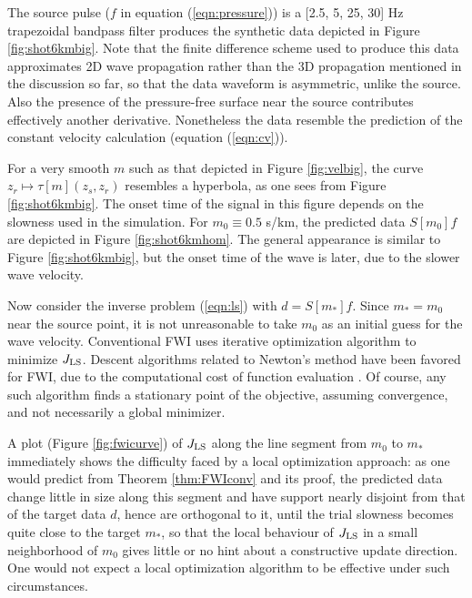 The source pulse ($f$ in equation (\ref{eqn:pressure})) is a [2.5, 5, 25, 30]
Hz trapezoidal bandpass filter produces the synthetic data
depicted in Figure \ref{fig:shot6kmbig}. Note that the finite
difference scheme used to produce this data approximates 2D wave
propagation rather than the 3D propagation mentioned in the discussion
so far, so that the data waveform is asymmetric, unlike the
source. Also the presence of the pressure-free surface near the source
contributes effectively another derivative. Nonetheless the data
resemble the prediction of the constant velocity calculation (equation
(\ref{eqn:cv})).

For a very smooth $m$ such as that depicted in Figure
\ref{fig:velbig}, the curve $z_r \mapsto \tau[m](z_s,z_r)$ resembles a hyperbola, as one sees from Figure
\ref{fig:shot6kmbig}. The onset time of the signal in this figure
depends on the slowness used in the simulation. For
$m_0 \equiv 0.5$ s/km, the predicted data $S[m_0]f$ are depicted in
Figure \ref{fig:shot6kmhom}. The general appearance is similar to   Figure
\ref{fig:shot6kmbig}, but the onset time of the wave is later, due to
the slower wave velocity.

Now consider the inverse problem (\ref{eqn:ls}) with $d=S[m_*]f$. Since
$m_*=m_0$ near the source point, it is not unreasonable to take $m_0$
as an initial guess for the wave velocity. Conventional FWI uses
iterative optimization algorithm to minimize $J_{\rm LS}$. Descent
algorithms related to Newton's method have been favored for FWI, due
to the computational cost of function evaluation
\cite[]{VirieuxOperto:09}. Of course, any such algorithm finds a
stationary point of the objective, assuming convergence, and not
necessarily a global minimizer.

A plot (Figure \ref{fig:fwicurve}) 
of $J_{\rm LS}$ along the line
segment from $m_0$ to $m_*$ immediately shows the difficulty faced by
a local optimization approach: as one
would predict from Theorem \ref{thm:FWIconv} and its proof, the predicted data change
little in size along this segment and have support nearly disjoint
from that of the target data $d$, hence are orthogonal to it, until the trial slowness becomes
quite close to the target $m_*$, so that the local behaviour of $J_{\rm LS}$ in a small
neighborhood of $m_0$ gives little or
no hint about a constructive update direction. One would not expect a
local optimization algorithm to be effective under such circumstances.

